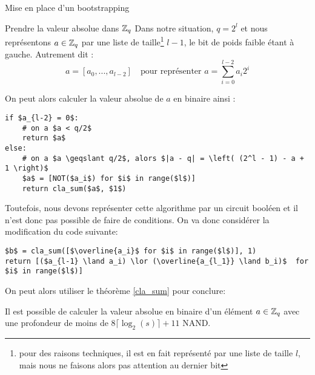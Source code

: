 \begin{section}{Mise en place d'un bootstrapping}
\begin{subsection}{Prendre la valeur absolue dans $\mathbb{Z}_q$}
	Dans notre situation, $q = 2^l$ et nous représentons $a\in \mathbb{Z}_q$ par une liste de taille\footnote{pour des raisons techniques, il est en fait représenté par une liste de taille $l$, mais nous ne faisons alors pas attention au dernier bit} $l-1$, le bit de poids faible étant à gauche. Autrement dit :
\[ a = [a_0, ..., a_{l-2}] \quad \text{pour représenter } a = \sum_{i=0}^{l-2} a_i 2^i\]

	On peut alors calculer la valeur absolue de $a$ en binaire ainsi :

\vspace{0.3cm}
\begin{lstlisting}
if $a_{l-2} = 0$: 
	# on a $a < q/2$
	return $a$
else:
	# on a $a \geqslant q/2$, alors $|a - q| = \left( (2^l - 1) - a + 1 \right)$
	$a$ = [NOT($a_i$) for $i$ in range($l$)]
	return cla_sum($a$, $1$)
\end{lstlisting}
\vspace{0.3cm}

Toutefois, nous devons représenter cette algorithme par un circuit booléen et il n'est donc pas possible de faire de
conditions. On va donc considérer la modification du code suivante:

\vspace{0.3cm}
\begin{lstlisting}
$b$ = cla_sum([$\overline{a_i}$ for $i$ in range($l$)], 1)
return [($a_{l-1} \land a_i) \lor (\overline{a_{l_1}} \land b_i)$  for $i$ in range($l$)]
\end{lstlisting}
\vspace{0.3cm}

	On peut alors utiliser le théorème \ref{cla_sum} pour conclure:
\begin{prop}
Il est possible de calculer la valeur absolue en binaire d'un élément $a\in \mathbb{Z}_q$ avec une profondeur de moins de
$8\lceil \log_2(s) \rceil + 11$ NAND.
\end{prop}
\end{subsection}


\end{section}
